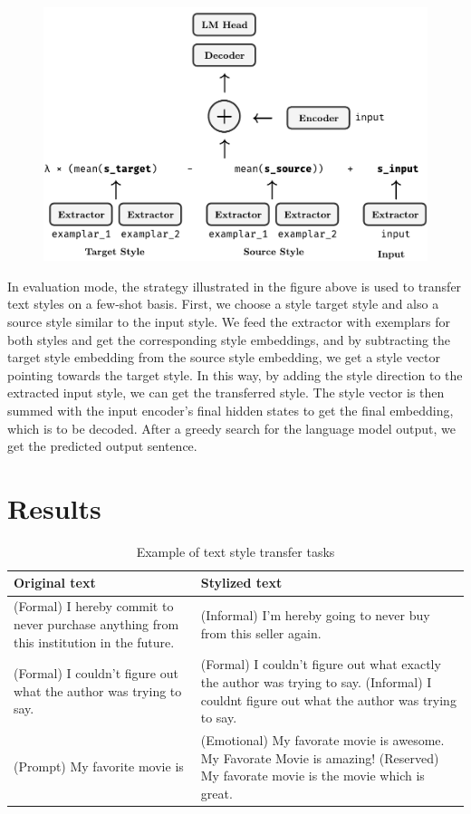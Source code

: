 \documentclass[a2paper]{article}
\begin{document}
\begin{figure}[h!]
    \includegraphics[width=\linewidth]{eval.pdf}
\end{figure}

In evaluation mode, the strategy illustrated in the figure above is used to transfer text styles on a few-shot basis. First, we choose a style target style and also a source style similar to the input style. We feed the extractor with exemplars for both styles and get the corresponding style embeddings, and by subtracting the target style embedding from the source style embedding, we get a style vector pointing towards the target style. In this way, by adding the style direction to the extracted input style, we can get the transferred style. The style vector is then summed with the input encoder's final hidden states to get the final embedding, which is to be decoded. After a greedy search for the language model output, we get the predicted output sentence.

\section{Results}

\begin{table}[h!]
    \centering
    \label{tab:result}
    \begin{tabularx}{\linewidth}{XX}
    Original text & Stylized text \\  \midrule
    (Formal) I hereby commit to never purchase anything from this institution in the future. & (Informal) I'm hereby going to never buy from this seller again.\\
    (Formal) I couldn’t figure out what the author was trying to say. & (Formal) I couldn't figure out what exactly the author was trying to say. \newline (Informal) I couldnt figure out what the author was trying to say.\\
    (Prompt) My favorite movie is & (Emotional) My favorate movie is awesome. My Favorate Movie is amazing! \newline (Reserved) My favorate movie is the movie which is great.\\
    \end{tabularx}
    \caption{Example of text style transfer tasks}
\end{table}
\end{document}
